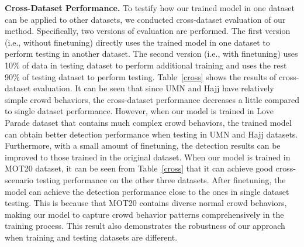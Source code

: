 \documentclass[journal]{IEEEtran}
\begin{document}
\begin{table*}[ht]
\centering
\caption{Frame-level AUC of our method when training and testing are conducted on different datasets.}
\label{cross}
\end{table*}

\noindent \textbf{Cross-Dataset Performance.} 
To testify how our trained model in one dataset can be applied to other datasets, we conducted cross-dataset evaluation of our method. Specifically, two versions of evaluation are performed. The first version (i.e., without finetuning) directly uses the trained model in one dataset to perform testing in another dataset. The second version (i.e., with finetuning) uses 10\% of data in testing dataset to perform additional training and uses the rest  90\% of testing dataset to perform testing. Table~\ref{cross} shows the results of cross-dataset evaluation. It can be seen that since UMN and Hajj have relatively simple crowd behaviors, the cross-dataset performance decreases a little compared to single dataset performance. However, when our model is trained in Love Parade dataset that contains much complex crowd behaviors, the trained model can obtain better detection performance when testing in UMN and Hajj datasets. Furthermore, with a small amount of finetuning, the detection results can be improved to those trained in the original dataset. 
When our model is trained in MOT20 dataset, it can be seen from Table~\ref{cross} that it can achieve good cross-scenario testing performance on the other three datasets. After finetuning, the model can achieve the detection performance close to the ones in single dataset testing. This is because that MOT20 contains diverse normal crowd behaviors, making our model to capture crowd behavior patterns comprehensively in the training process. This result also demonstrates the robustness of our approach when training and testing datasets are different.
\end{document}

